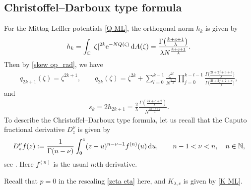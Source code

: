 \documentclass[pdftex]{sigma}
\numberwithin{equation}{section}
\newcommand{\C}{{\mathbb C}}
\newcommand{\1}{\chi}
\begin{document}
\subsection{Christoffel--Darboux type formula}
For the Mittag-Leffler potentials \eqref{Q ML}, the orthogonal norm $h_k$ is given by
\begin{gather*}
h_k=\int_\C |\zeta|^{2k} {\rm e}^{-N Q(\zeta)} \, {\rm d}A(\zeta)=\frac{\Gamma\big( \frac{k+c+1}{\lambda} \big)}{\lambda N^{\frac{k+c+1}{\lambda}} } .
\end{gather*}
Then by \eqref{skew op_rad}, we have
\begin{gather} \label{SOP ML}
	q_{2k+1}(\zeta)=\zeta^{2k+1}, \qquad q_{2k}(\zeta)=\zeta^{2k}+ \sum_{l=0}^{k-1} \frac{\zeta^{2l}}{N^{\frac{k-l}{\lambda}}} \prod_{j=0}^{k-l-1} \frac{ \Gamma\big( \frac{2l+2j+3+c}{\lambda} \big) }{ \Gamma\big( \frac{2l+2j+2+c}{\lambda} \big) } ,
\end{gather}
and
\begin{gather} \label{sk ML}
	s_k=2h_{2k+1}=\frac{2}{\lambda } \frac{\Gamma( \frac{2k+c+2}{\lambda} )}{N^{\frac{2k+c+2}{\lambda}} } .
\end{gather}
To describe the Christoffel--Darboux type formula, let us recall that the Caputo fractional derivative $D^\nu_z$ is given by
\begin{gather*}
	D^\nu_z f(z):=\frac{1}{\Gamma(n-\nu)} \int_{0}^{z} (z-u)^{n-\nu-1} f^{(n)}(u) \, {\rm d}u, \qquad n-1 < \nu <n, \quad n \in \mathbb{N},
\end{gather*}
see \cite[Section 2.4]{MR2218073}. Here $f^{(n)}$ is the usual $n$:th derivative.

Recall that $p=0$
in the rescaling \eqref{zeta eta} here,
and $K_{\lambda,c}$ is given by \eqref{K ML}.
\end{document}
